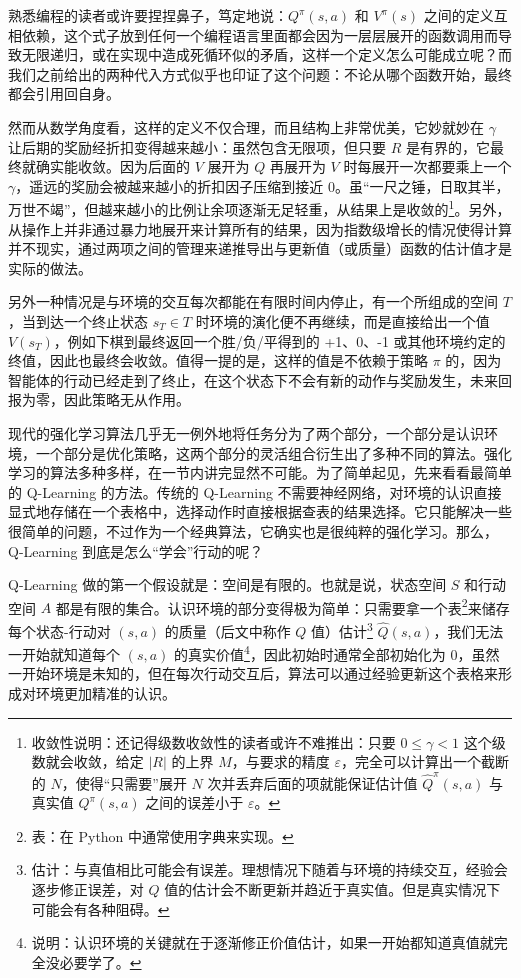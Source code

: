 熟悉编程的读者或许要捏捏鼻子，笃定地说：$Q^\pi (s, a)$ 和 $V^\pi (s)$ 之间的定义互相依赖，这个式子放到任何一个编程语言里面都会因为一层层展开的函数调用而导致无限递归，或在实现中造成死循环似的矛盾，这样一个定义怎么可能成立呢？而我们之前给出的两种代入方式似乎也印证了这个问题：不论从哪个函数开始，最终都会引用回自身。

然而从数学角度看，这样的定义不仅合理，而且结构上非常优美，它妙就妙在 $\gamma$ 让后期的奖励经折扣变得越来越小：虽然包含无限项，但只要 $R$ 是有界的，它最终就确实能收敛。因为后面的 $V$ 展开为 $Q$ 再展开为 $V$ 时每展开一次都要乘上一个 $\gamma$，遥远的奖励会被越来越小的折扣因子压缩到接近 $0$。虽“一尺之锤，日取其半，万世不竭”，但越来越小的比例让余项逐渐无足轻重，从结果上是收敛的\footnote{收敛性说明：还记得级数收敛性的读者或许不难推出：只要 $0 \le \gamma < 1$ 这个级数就会收敛，给定 $|R|$ 的上界 $M$，与要求的精度 $\varepsilon$，完全可以计算出一个截断的 $N$，使得“只需要”展开 $N$ 次并丢弃后面的项就能保证估计值 $\hat Q^\pi (s, a)$ 与真实值 $Q^\pi (s, a)$ 之间的误差小于 $\varepsilon$。}。另外，从操作上并非通过暴力地展开来计算所有的结果，因为指数级增长的情况使得计算并不现实，通过两项之间的管理来递推导出与更新值（或质量）函数的估计值才是实际的做法。

另外一种情况是与环境的交互每次都能在有限时间内停止，有一个所组成的空间 $T$，当到达一个终止状态 $s_T \in T$ 时环境的演化便不再继续，而是直接给出一个值 $V(s_T)$，例如下棋到最终返回一个胜/负/平得到的 +1、0、-1 或其他环境约定的终值，因此也最终会收敛。值得一提的是，这样的值是不依赖于策略 $\pi$ 的，因为智能体的行动已经走到了终止，在这个状态下不会有新的动作与奖励发生，未来回报为零，因此策略无从作用。

现代的强化学习算法几乎无一例外地将任务分为了两个部分，一个部分是认识环境，一个部分是优化策略，这两个部分的灵活组合衍生出了多种不同的算法。强化学习的算法多种多样，在一节内讲完显然不可能。为了简单起见，先来看看最简单的 Q-Learning 的方法。传统的 Q-Learning 不需要神经网络，对环境的认识直接显式地存储在一个表格中，选择动作时直接根据查表的结果选择。它只能解决一些很简单的问题，不过作为一个经典算法，它确实也是很纯粹的强化学习。那么，Q-Learning 到底是怎么“学会”行动的呢？

Q-Learning 做的第一个假设就是：空间是有限的。也就是说，状态空间 $S$ 和行动空间 $A$ 都是有限的集合。认识环境的部分变得极为简单：只需要拿一个表\footnote{表：在 Python 中通常使用字典来实现。}来储存每个状态-行动对 $(s, a)$ 的质量（后文中称作 $Q$ 值）估计\footnote{估计：与真值相比可能会有误差。理想情况下随着与环境的持续交互，经验会逐步修正误差，对 $Q$ 值的估计会不断更新并趋近于真实值。但是真实情况下可能会有各种阻碍。} $\hat Q(s, a)$，我们无法一开始就知道每个 $(s, a)$ 的真实价值\footnote{说明：认识环境的关键就在于逐渐修正价值估计，如果一开始都知道真值就完全没必要学了。}，因此初始时通常全部初始化为 0，虽然一开始环境是未知的，但在每次行动交互后，算法可以通过经验更新这个表格来形成对环境更加精准的认识。

